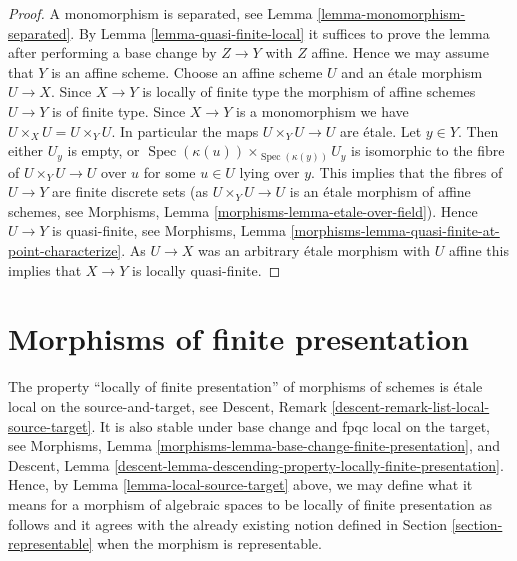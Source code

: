 \documentclass{stacks-project}
\theoremstyle{plain}
\theoremstyle{definition}
\theoremstyle{remark}
\numberwithin{equation}{subsection}
\def\Spec{\mathop{\mathrm{Spec}}}
\begin{document}
\begin{proof}
A monomorphism is separated, see
Lemma \ref{lemma-monomorphism-separated}.
By
Lemma \ref{lemma-quasi-finite-local}
it suffices to prove the lemma after performing a base change
by $Z \to Y$ with $Z$ affine. Hence we may assume that $Y$ is an
affine scheme. Choose an affine scheme $U$ and an \'etale morphism
$U \to X$. Since $X \to Y$ is locally of finite type the morphism
of affine schemes $U \to Y$ is of finite type.
Since $X \to Y$ is a monomorphism we have $U \times_X U = U \times_Y U$.
In particular the maps $U \times_Y U \to U$ are \'etale.
Let $y \in Y$. Then either $U_y$ is empty, or
$\Spec(\kappa(u)) \times_{\Spec(\kappa(y))} U_y$
is isomorphic to the fibre of $U \times_Y U \to U$ over $u$ for
some $u \in U$ lying over $y$. This implies that the fibres of
$U \to Y$ are finite discrete sets (as $U \times_Y U \to U$
is an \'etale morphism of affine schemes, see
Morphisms, Lemma \ref{morphisms-lemma-etale-over-field}).
Hence $U \to Y$ is quasi-finite, see
Morphisms, Lemma \ref{morphisms-lemma-quasi-finite-at-point-characterize}.
As $U \to X$ was an arbitrary \'etale morphism with $U$ affine
this implies that $X \to Y$ is locally quasi-finite.
\end{proof}













\section{Morphisms of finite presentation}
\label{section-finite-presentation}

\noindent
The property ``locally of finite presentation'' of morphisms of schemes is
\'etale local on the source-and-target, see
Descent, Remark \ref{descent-remark-list-local-source-target}.
It is also stable under base change and fpqc local on the target, see
Morphisms, Lemma \ref{morphisms-lemma-base-change-finite-presentation}, and
Descent,
Lemma \ref{descent-lemma-descending-property-locally-finite-presentation}.
Hence, by
Lemma \ref{lemma-local-source-target}
above, we may define what it means for a morphism of algebraic spaces
to be locally of finite presentation as
follows and it agrees with the already existing notion defined in
Section \ref{section-representable}
when the morphism is representable.
\end{document}
